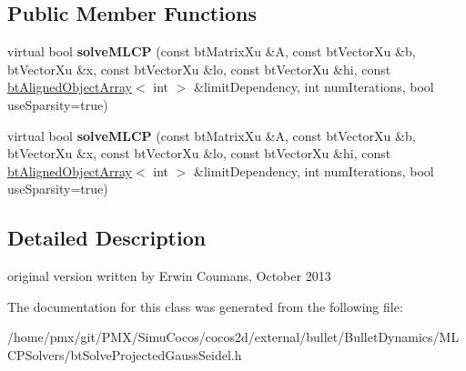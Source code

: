 \subsection*{Public Member Functions}
\begin{DoxyCompactItemize}
\item 
\mbox{\label{classbtSolveProjectedGaussSeidel_af012047de455174c3076ebe09fe0445e}} 
virtual bool {\bfseries solve\+M\+L\+CP} (const bt\+Matrix\+Xu \&A, const bt\+Vector\+Xu \&b, bt\+Vector\+Xu \&x, const bt\+Vector\+Xu \&lo, const bt\+Vector\+Xu \&hi, const \hyperlink{classbtAlignedObjectArray}{bt\+Aligned\+Object\+Array}$<$ int $>$ \&limit\+Dependency, int num\+Iterations, bool use\+Sparsity=true)
\item 
\mbox{\label{classbtSolveProjectedGaussSeidel_af012047de455174c3076ebe09fe0445e}} 
virtual bool {\bfseries solve\+M\+L\+CP} (const bt\+Matrix\+Xu \&A, const bt\+Vector\+Xu \&b, bt\+Vector\+Xu \&x, const bt\+Vector\+Xu \&lo, const bt\+Vector\+Xu \&hi, const \hyperlink{classbtAlignedObjectArray}{bt\+Aligned\+Object\+Array}$<$ int $>$ \&limit\+Dependency, int num\+Iterations, bool use\+Sparsity=true)
\end{DoxyCompactItemize}


\subsection{Detailed Description}
original version written by Erwin Coumans, October 2013 

The documentation for this class was generated from the following file\+:\begin{DoxyCompactItemize}
\item 
/home/pmx/git/\+P\+M\+X/\+Simu\+Cocos/cocos2d/external/bullet/\+Bullet\+Dynamics/\+M\+L\+C\+P\+Solvers/bt\+Solve\+Projected\+Gauss\+Seidel.\+h\end{DoxyCompactItemize}
